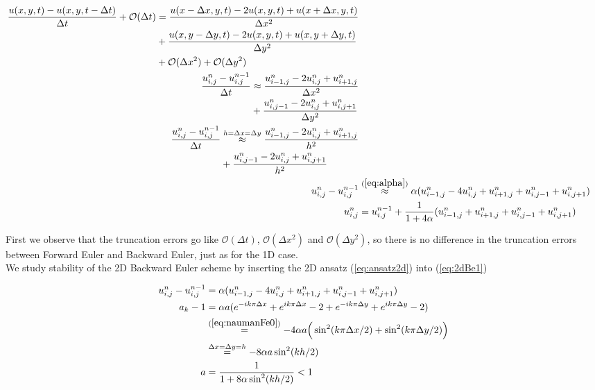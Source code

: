 \documentclass{article}
\begin{document}
\begin{subequations}
	\begin{align}
		\begin{split}
			\frac{u(x,y, t) - u(x,y,t - \Delta t)}{\Delta t} + \mathcal{O}(\Delta t) &= \frac{u(x - \Delta x,y, t) 
				- 2u(x,y,t) + u(x+ \Delta x,y, t)}{\Delta x^2} \\
			&+ \frac{u(x,y - \Delta y, t) - 2u(x,y,t) + u(x,y+ \Delta y, t)}{\Delta y^2}\\
			&+ \mathcal{O}(\Delta x^2) + \mathcal{O}(\Delta y^2)
		\end{split}\\
		\begin{split}
		\frac{u_{i,j}^n - u_{i,j}^{n-1}}{\Delta t}  &\approx \frac{u_{i-1,j}^{n} 
			- 2u_{i,j}^n + u_{i+1,j}^n}{\Delta x^2} \\
		&+ \frac{u_{i,j-1}^n - 2u_{i,j}^n + u_{i,j+1}^n}{\Delta y^2}
		\end{split}\\
		\begin{split}
			\frac{u_{i,j}^n - u_{i,j}^{n-1}}{\Delta t} &\stackrel{h = \Delta x = \Delta y}{\approx} \frac{u_{i-1,j}^{n} 
			- 2u_{i,j}^n + u_{i+1,j}^n}{h^2} \\
			&+ \frac{u_{i,j-1}^n - 2u_{i,j}^n + u_{i,j+1}^n}{h^2}
		\end{split}\\				
		u_{i,j}^n - u_{i,j}^{n-1}  &\stackrel{(\ref{eq:alpha})}{\approx} \alpha (u_{i-1,j}^{n} 
			- 4u_{i,j}^n + u_{i+1,j}^n + u_{i,j-1}^n + u_{i,j+1}^n)\label{eq:2dBe1}\\
		u_{i,j}^n &= u_{i,j}^{n-1}  + \frac{1}{1+4\alpha}(u_{i-1,j}^{n} 
		+ u_{i+1,j}^n + u_{i,j-1}^n + u_{i,j+1}^n)\label{eq:2dBe}
	\end{align}
\end{subequations}

First we observe that the truncation errors go like $\mathcal{O}(\Delta t)$, $\mathcal{O}(\Delta x^2)$ and $\mathcal{O}(\Delta y^2)$, so there is no difference in the truncation errors between Forward Euler and Backward Euler, just as for the 1D case.\\

We study stability of the 2D Backward Euler scheme by inserting the 2D ansatz (\ref{eq:ansatz2d}) into
(\ref{eq:2dBe1})

\begin{subequations}
	\begin{align}
	u_{i,j}^n - u_{i,j}^{n-1} 
	&=
	\alpha (u_{i-1,j}^{n} 
	- 4u_{i,j}^n + u_{i+1,j}^n + u_{i,j-1}^n + u_{i,j+1}^n)\\
	a_k - 1 &= \alpha a (e^{-ik \pi \Delta x} + e^{ik \pi \Delta x} -2 + e^{-ik \pi \Delta y} + e^{ik \pi \Delta y} -2 )\\
	&\stackrel{(\ref{eq:naumanFe0})}{=} - 4 \alpha a \Big(\sin^2(k \pi \Delta x/2) +  \sin^2(k \pi \Delta y/2)\Big)\\
	&\stackrel{\Delta x = \Delta y = h}{=} -8 \alpha a \sin^2(kh/2)\\
	a &= \frac{1}{1+ 8 \alpha \sin^2(kh/2)} < 1\label{eq:2dBeStability}
	\end{align}
\end{subequations}
\end{document}
